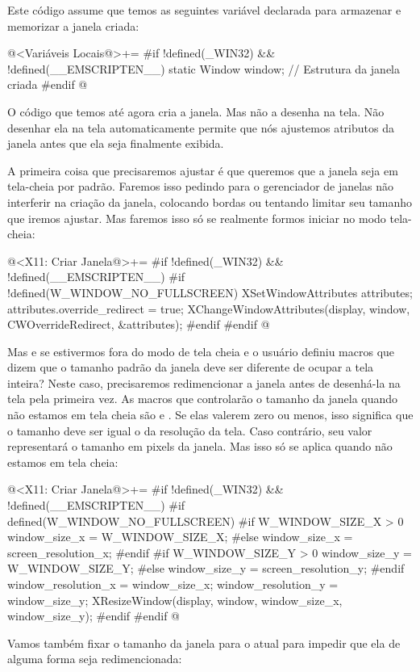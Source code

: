 Este código assume que temos as seguintes variável declarada para
armazenar e memorizar a janela criada:

\iniciocodigo
@<Variáveis Locais@>+=
#if !defined(_WIN32) && !defined(__EMSCRIPTEN__)
static Window window;    // Estrutura da janela criada
#endif
@
\fimcodigo

O código que temos até agora cria a janela. Mas não a desenha na
tela. Não desenhar ela na tela automaticamente permite que nós
ajustemos atributos da janela antes que ela seja finalmente exibida.

A primeira coisa que precisaremos ajustar é que queremos que a janela
seja em tela-cheia por padrão. Faremos isso pedindo para o gerenciador
de janelas não interferir na criação da janela, colocando bordas ou
tentando limitar seu tamanho que iremos ajustar. Mas faremos isso só
se realmente formos iniciar no modo tela-cheia:

\iniciocodigo
@<X11: Criar Janela@>+=
#if !defined(_WIN32) && !defined(__EMSCRIPTEN__)
#if !defined(W_WINDOW_NO_FULLSCREEN)
{
  XSetWindowAttributes attributes;
  attributes.override_redirect = true;
  XChangeWindowAttributes(display, window, CWOverrideRedirect,
                          &attributes);
}
#endif
#endif
@
\fimcodigo

Mas e se estivermos fora do modo de tela cheia e o usuário definiu
macros que dizem que o tamanho padrão da janela deve ser diferente de
ocupar a tela inteira? Neste caso, precisaremos redimencionar a janela
antes de desenhá-la na tela pela primeira vez. As macros que
controlarão o tamanho da janela quando não estamos em tela cheia
são 
e . Se elas valerem zero ou
menos, isso significa que o tamanho deve ser igual o da resolução da
tela. Caso contrário, seu valor representará o tamanho em pixels da
janela. Mas isso só se aplica quando não estamos em tela cheia:

\iniciocodigo
@<X11: Criar Janela@>+=
#if !defined(_WIN32) && !defined(__EMSCRIPTEN__)
#if defined(W_WINDOW_NO_FULLSCREEN)
{
#if W_WINDOW_SIZE_X > 0
  window_size_x = W_WINDOW_SIZE_X;
#else
  window_size_x = screen_resolution_x;
#endif
#if W_WINDOW_SIZE_Y > 0
  window_size_y = W_WINDOW_SIZE_Y;
#else
  window_size_y = screen_resolution_y;
#endif
  window_resolution_x = window_size_x;
  window_resolution_y = window_size_y;
  XResizeWindow(display, window, window_size_x, window_size_y);  
}
#endif
#endif
@
\fimcodigo

Vamos também fixar o tamanho da janela para o atual para impedir que
ela de alguma forma seja redimencionada:

